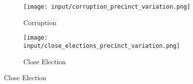 \begin{figure}[H]
    \centering
    \caption{ATT across number of precincts used}
    \label{fig:ATT_across_precincts}

    \begin{subfigure}{.48\linewidth}
        \centering
        \texttt{[image: input/corruption\_precinct\_variation.png]}
        \caption{Corruption}
        \label{fig:ATT_over_time:corruption}
    \end{subfigure}\hfill
    \begin{subfigure}{.48\linewidth}
        \centering
        \texttt{[image: input/close\_elections\_precinct\_variation.png]}
        \caption{Close Election}
        \label{fig:ATT_across_precincts:close_election}
    \end{subfigure}
\end{figure}